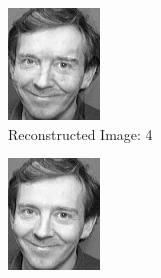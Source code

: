 \documentclass[12pt]{article}
\begin{document}
\begin{figure}
\begin{subfigure}[b]{0.20\textwidth}
		\includegraphics[width=\textwidth]{Task4.6_Images/ReconstructedImage4.jpg}
		\caption{Reconstructed Image: 4}
	\end{subfigure}\quad
	\begin{subfigure}[b]{0.20\textwidth}
		\includegraphics[width=\textwidth]{Task4.6_Images/ReconstructedImage5.jpg}

\end{subfigure}
\end{figure}
\end{document}
